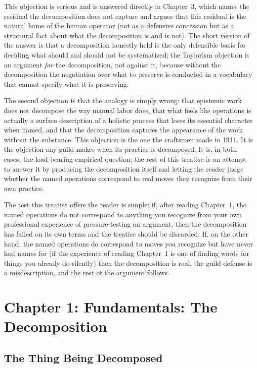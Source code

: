 \documentclass[11pt]{article}
\begin{document}
This objection is serious and is answered directly in Chapter~3, which names the residual the decomposition does not capture and argues that this residual is the natural home of the human operator (not as a defensive concession but as a structural fact about what the decomposition is and is not). The short version of the answer is that a decomposition honestly held is the only defensible basis for deciding what should and should not be systematized; the Taylorism objection is an argument \emph{for} the decomposition, not against it, because without the decomposition the negotiation over what to preserve is conducted in a vocabulary that cannot specify what it is preserving.

The second objection is that the analogy is simply wrong: that epistemic work does not decompose the way manual labor does, that what feels like operations is actually a surface description of a holistic process that loses its essential character when named, and that the decomposition captures the appearance of the work without the substance. This objection is the one the craftsmen made in 1911. It is the objection any guild makes when its practice is decomposed. It is, in both cases, the load-bearing empirical question; the rest of this treatise is an attempt to answer it by producing the decomposition itself and letting the reader judge whether the named operations correspond to real moves they recognize from their own practice.

The test this treatise offers the reader is simple: if, after reading Chapter~1, the named operations do not correspond to anything you recognize from your own professional experience of pressure-testing an argument, then the decomposition has failed on its own terms and the treatise should be discarded. If, on the other hand, the named operations do correspond to moves you recognize but have never had names for (if the experience of reading Chapter~1 is one of finding words for things you already do silently) then the decomposition is real, the guild defense is a misdescription, and the rest of the argument follows.

\section{Chapter 1: Fundamentals: The Decomposition}

\subsection{The Thing Being Decomposed}
\end{document}
